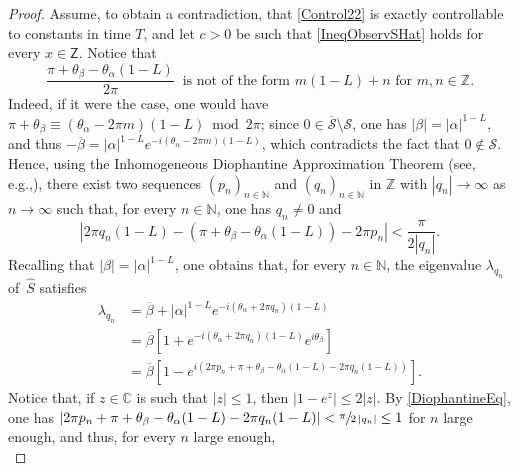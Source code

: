 \documentclass[JEP,XML,SOM,Unicode]{cedram}
\renewcommand{\eg}{e.g.,\xspace}
\theoremstyle{plain}
\theoremstyle{definition}
\newcommand{\abs}[1]{\left\lvert #1\right \rvert}
\begin{document}
\begin{proof}
Assume, to obtain a contradiction, that \eqref{Control22} is exactly controllable to constants in time $T$, and let $c > 0$ be such that \eqref{IneqObservSHat} holds for every $x \in \mathsf Z$. Notice that
\begin{equation}\label{eq:mn}
\frac{\pi + \theta_\beta - \theta_\alpha(1 - L)}{2 \pi}\ \text{ is not of the form } m (1 - L) + n \text{ for } m, n \in \mathbb Z.
\end{equation}
Indeed, if it were the case, one would have $\pi + \theta_\beta \equiv (\theta_\alpha - 2 \pi m) (1 - L) \bmod 2 \pi$; since $0 \in \overline{\mathcal S} \setminus \mathcal S$, one has $\abs{\beta} = \abs{\alpha}^{1 - L}$, and thus $-\overline\beta = \abs{\alpha}^{1 - L} e^{- i (\theta_\alpha - 2 \pi m) (1 - L)}$, which contradicts the fact that $0 \notin \mathcal S$. Hence, using the Inhomogeneous Diophantine Approximation Theorem (see, \eg \cite[Chap.\,III, Th.\,II\,A]{Cassels1957Introduction}), there exist two sequences $(p_n)_{n \in \mathbb N}$ and $(q_n)_{n \in \mathbb N}$ in $\mathbb Z$ with $\abs{q_n} \to \infty$ as $n \to \infty$ such that, for every $n \in \mathbb N$, one has $q_n \neq 0$ and
\begin{equation}
\label{DiophantineEq}
\abs{2 \pi q_n (1 - L) - (\pi + \theta_\beta - \theta_\alpha (1 - L)) - 2 \pi p_n} < \frac{\pi}{2 \abs{q_n}}.
\end{equation}
Recalling that $\abs{\beta} = \abs{\alpha}^{1 - L}$, one obtains that, for every $n \in \mathbb N$, the eigenvalue $\lambda_{q_n}$ of~$\widehat S$ satisfies
\begin{equation}
\label{LambdaN}
\begin{aligned}
\lambda_{q_n} & = \overline\beta + \abs{\alpha}^{1 - L} e^{- i (\theta_\alpha + 2 \pi q_n)(1 - L)} \\
& = \overline\beta\left[1 + e^{-i(\theta_\alpha + 2 \pi q_n)(1 - L)} e^{i \theta_\beta}\right] \\
& = \overline\beta\left[1 - e^{i (2 \pi p_n + \pi + \theta_\beta - \theta_\alpha(1 - L) - 2 \pi q_n (1 - L))}\right].
\end{aligned}
\end{equation}
Notice that, if $z \in \mathbb C$ is such that $\abs{z} \leq 1$, then $\abs{1 - e^z} \leq 2 \abs{z}$. By \eqref{DiophantineEq}, one has $\lvert 2 \pi p_n + \pi + \theta_\beta - \theta_\alpha(1 - L) - 2 \pi q_n (1 - L) \rvert < \sfrac{\pi}{2 \abs{q_n}} \leq 1$ for $n$ large enough, and thus, for every $n$ large enough,
\begin{equation}
\label{EstimLambdaN}

\end{equation}
\end{proof}
\end{document}
